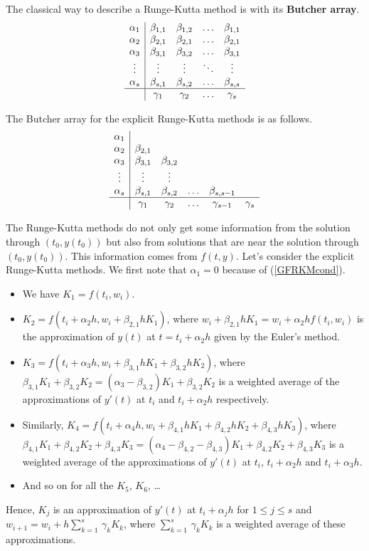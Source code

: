 The classical way to describe a Runge-Kutta method is with its
{\bfseries Butcher array}.
\[
\begin{array}{c|ccccc}
\alpha_1 & \beta_{1,1} & \beta_{1,2} & \ldots & \beta_{1,1} \\
\alpha_2 & \beta_{2,1} & \beta_{2,1} & \ldots & \beta_{2,1} \\
\alpha_3 & \beta_{3,1} & \beta_{3,2} & \ldots & \beta_{3,1} \\
\vdots & \vdots & \vdots & \ddots & \vdots \\
\alpha_s & \beta_{s,1} & \beta_{s,2} & \ldots & \beta_{s,s}\\
\hline
 & \gamma_1 & \gamma_2 & \ldots & \gamma_s
\end{array}
\]

The Butcher array for the explicit Runge-Kutta methods is as
follows.
\[
\begin{array}{c|ccccc}
\alpha_1 & & & & & \\
\alpha_2 & \beta_{2,1} & & & & \\
\alpha_3 & \beta_{3,1} & \beta_{3,2} & & & \\
\vdots & \vdots & \vdots & & & \\
\alpha_s & \beta_{s,1} & \beta_{s,2} & \ldots & \beta_{s,s-1} & \\
\hline
 & \gamma_1 & \gamma_2 & \ldots & \gamma_{s-1} & \gamma_s
\end{array}
\]

The Runge-Kutta methods do not only get some information from the
solution through $(t_0,y(t_0))$ but also from solutions that are near the
solution through $(t_0,y(t_0))$.  This information comes from $f(t,y)$.
Let's consider the explicit Runge-Kutta methods.  We first note that
$\alpha_1=0$ because of (\ref{GFRKMcond}).
\begin{itemize}
\item We have $K_1 = f(t_i,w_i)$.
\item $K_2 = f(t_i+\alpha_2 h,w_i + \beta_{2,1} h K_1)$,
where $w_i + \beta_{2,1} h K_1 = w_i + \alpha_2 h f(t_i,w_i)$ is
the approximation of $y(t)$ at $t=t_i+\alpha_2 h$ given by the Euler's
method.
\item $K_3 = f(t_i+\alpha_3 h, w_i + \beta_{3,1} h K_1 + \beta_{3,2} h K_2)$,
where $\beta_{3,1} K_1 + \beta_{3,2} K_2
= (\alpha_3 - \beta_{3,2})K_1 + \beta_{3,2} K_2$
is a weighted average of the approximations of $y'(t)$ at $t_i$ and
$t_i+\alpha_2 h$ respectively.
\item Similarly, 
$K_4 =  f(t_i+\alpha_4 h, w_i + \beta_{4,1} h K_1 + \beta_{4,2} h K_2
+ \beta_{4,3} h K_3)$, where
$\beta_{4,1} K_1 + \beta_{4,2} K_2 + \beta_{4,3} K_3
= (\alpha_4 - \beta_{4,2} - \beta_{4,3}) K_1 + \beta_{4,2} K_2 + \beta_{4,3} K_3$
is a weighted average of the approximations of $y'(t)$ at $t_i$,
$t_i + \alpha_2 h$ and $t_i + \alpha_3 h$.
\item And so on for all the $K_5$, $K_6$, \ldots
\end{itemize}
Hence, $K_j$ is an approximation
of $y'(t)$ at $t_i+\alpha_jh$ for $1\leq j \leq s$ and
$\displaystyle w_{i+1} = w_i + h \sum_{k=1}^s\,\gamma_k K_k$, where
$\displaystyle \sum_{k=1}^s\,\gamma_k K_k$ is a weighted average of
these approximations.

